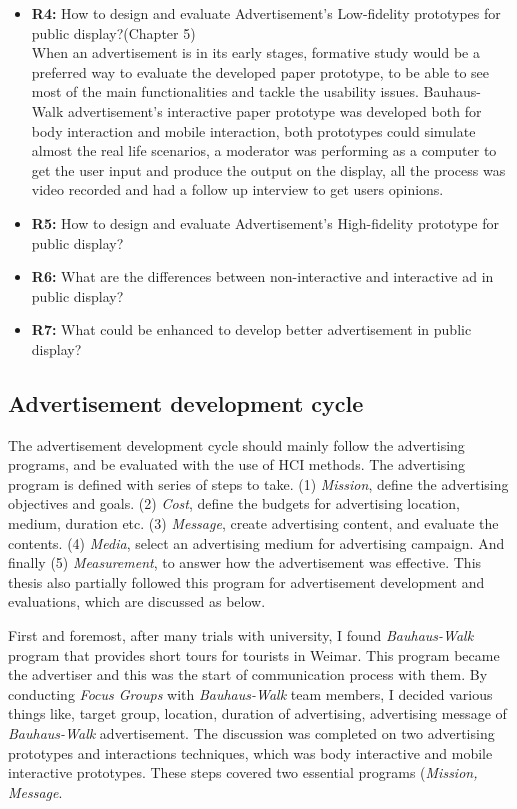 \begin{itemize}
\item \textbf{R4: }How to design and evaluate Advertisement's Low-fidelity prototypes for public display?(Chapter 5) \\
When an advertisement is in its early stages, formative study would be a preferred way to evaluate the developed paper prototype, to be able to see most of the main functionalities and tackle the usability issues. Bauhaus-Walk advertisement’s interactive paper prototype was developed both for body interaction and mobile interaction, both prototypes could simulate almost the real life scenarios, a moderator was performing as a computer to get the user input and produce the output on the display, all the process was video recorded and had a follow up interview to get users opinions. 


\item \textbf{R5: }How to design and evaluate Advertisement's High-fidelity prototype for public display?
\item \textbf{R6: }What are the differences between non-interactive and interactive ad in public display?
\item \textbf{R7: }What could be enhanced to develop better advertisement in public display? 

\end{itemize}
\fi

\subsection{Advertisement development cycle}
The advertisement development cycle should mainly follow the advertising programs\cite{ad_def}, and be evaluated with the use of HCI methods. The advertising program is defined with series of steps to take. (1) \emph{Mission}, define the advertising objectives and goals. (2) \emph{Cost}, define the budgets for advertising location, medium, duration etc. (3) \emph{Message}, create advertising content, and evaluate the contents. (4) \emph{Media}, select an advertising medium for advertising campaign. And finally (5) \emph{Measurement}, to answer how the advertisement was effective. This thesis also partially followed this program for advertisement development and evaluations, which are discussed as below.

First and foremost, after many trials with university, I found \emph{Bauhaus-Walk} program that provides short tours for tourists in Weimar. This program became the advertiser and this was the start of communication process with them. By conducting \emph{Focus Groups} with \emph{Bauhaus-Walk} team members, I decided various things like, target group, location, duration of advertising, advertising message of \emph{Bauhaus-Walk} advertisement. The discussion was completed on two advertising prototypes and interactions techniques, which was body interactive and mobile interactive prototypes. These steps covered two essential programs (\emph{Mission, Message}.

